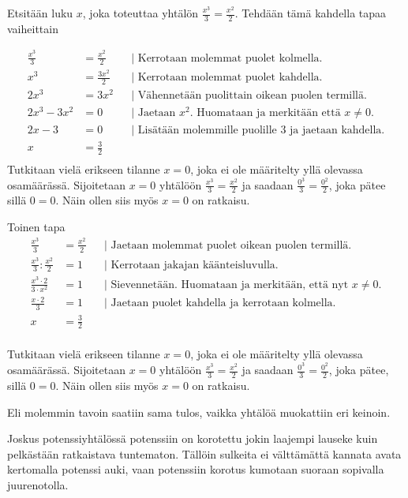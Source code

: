 \begin{esimerkki}
Etsitään luku $x$, joka toteuttaa yhtälön $\frac{x^3}{3}=\frac{x^2}{2}$. Tehdään tämä kahdella tapaa vaiheittain

		\begin{align*}
			\frac{x^3}{3}&=\frac{x^2}{2} && \text{| Kerrotaan molemmat puolet kolmella.} \\
			x^3 &=\frac{3x^2}{2}   && \text{| Kerrotaan molemmat puolet kahdella.} \\
			2x^3 &=3x^2 && \text{| Vähennetään puolittain oikean puolen termillä.} \\
			2x^3 -3x^2&=0 && \text{| Jaetaan $x^2$. Huomataan ja merkitään että $x\neq0$.} \\
			2x -3&=0 && \text{| Lisätään molemmille puolille $3$ ja jaetaan kahdella.} \\ 
			x&=\frac{3}{2} && \\
		\end{align*}
Tutkitaan vielä erikseen tilanne $x=0$, joka ei ole määritelty yllä olevassa osamäärässä. Sijoitetaan $x=0$ yhtälöön $\frac{x^3}{3}=\frac{x^2}{2}$ ja saadaan $\frac{0^3}{3}=\frac{0^2}{2}$, joka pätee sillä $0=0$. Näin ollen siis myös $x=0$ on ratkaisu. 

Toinen tapa
\begin{align*}
\frac{x^3}{3}&=\frac{x^2}{2} && \text{| Jaetaan molemmat puolet oikean puolen termillä. } \\
\frac{x^3}{3}:\frac{x^2}{2}&=1 && \text{| Kerrotaan jakajan käänteisluvulla.} \\
\frac{x^3\cdot2}{3\cdot x^2}&=1 && \text{| Sievennetään. Huomataan ja merkitään, että nyt $x\neq0$.} \\
\frac{x\cdot2}{3}&=1 && \text{| Jaetaan puolet kahdella ja kerrotaan kolmella.} \\
x&=\frac{3}{2} && \\
\end{align*}

Tutkitaan vielä erikseen tilanne $x=0$, joka ei ole määritelty yllä olevassa osamäärässä. Sijoitetaan $x=0$ yhtälöön $\frac{x^3}{3}=\frac{x^2}{2}$ ja saadaan $\frac{0^3}{3}=\frac{0^2}{2}$, joka pätee, sillä $0=0$. Näin ollen siis myös $x=0$ on ratkaisu.

Eli molemmin tavoin saatiin sama tulos, vaikka yhtälöä muokattiin eri keinoin.

\end{esimerkki}

Joskus potenssiyhtälössä potenssiin on korotettu jokin laajempi lauseke kuin pelkästään ratkaistava tuntematon. Tällöin sulkeita ei välttämättä kannata avata kertomalla potenssi auki, vaan potenssiin korotus kumotaan suoraan sopivalla juurenotolla.

